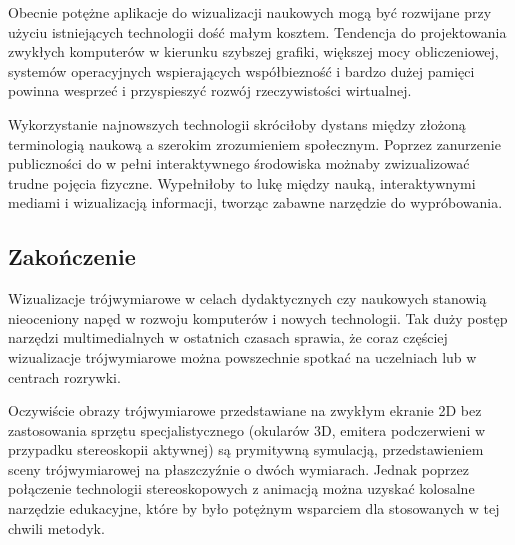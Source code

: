 Obecnie potężne aplikacje do wizualizacji naukowych mogą być rozwijane przy użyciu istniejących technologii dość małym kosztem. Tendencja do projektowania zwykłych komputerów w kierunku szybszej grafiki, większej mocy obliczeniowej, systemów operacyjnych wspierających współbiezność i bardzo dużej pamięci powinna wesprzeć i przyspieszyć rozwój rzeczywistości wirtualnej.

Wykorzystanie najnowszych technologii skróciłoby dystans między złożoną terminologią naukową a szerokim zrozumieniem społecznym. Poprzez zanurzenie publiczności do w pełni interaktywnego środowiska możnaby zwizualizować trudne pojęcia fizyczne. Wypełniłoby to lukę między nauką, interaktywnymi mediami i wizualizacją informacji, tworząc zabawne narzędzie do wypróbowania.

\subsection{Zakończenie}
Wizualizacje trójwymiarowe w celach dydaktycznych czy naukowych stanowią nieoceniony napęd w rozwoju komputerów i nowych technologii.   Tak duży postęp narzędzi multimedialnych w ostatnich czasach sprawia, że coraz częściej wizualizacje trójwymiarowe można powszechnie spotkać na uczelniach lub w centrach rozrywki.

Oczywiście obrazy trójwymiarowe przedstawiane na zwykłym ekranie 2D bez zastosowania sprzętu specjalistycznego (okularów 3D, emitera podczerwieni w przypadku stereoskopii aktywnej) są prymitywną symulacją, przedstawieniem sceny trójwymiarowej na płaszczyźnie o dwóch wymiarach. Jednak poprzez połączenie technologii stereoskopowych z animacją można uzyskać kolosalne narzędzie edukacyjne, które by było potężnym wsparciem dla stosowanych w tej chwili metodyk. 


